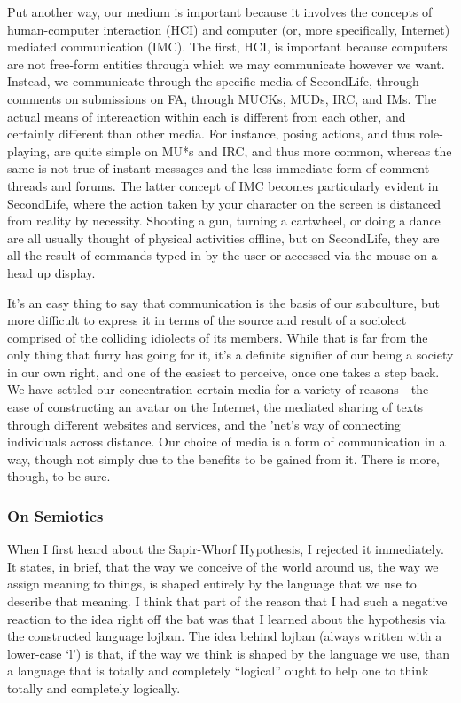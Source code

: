 Put another way, our medium is important because it involves the
concepts of human-computer interaction (HCI) and computer (or, more
specifically, Internet) mediated communication (IMC). The first, HCI, is
important because computers are not free-form entities through which we
may communicate however we want. Instead, we communicate through the
specific media of SecondLife, through comments on submissions on FA,
through MUCKs, MUDs, IRC, and IMs. The actual means of intereaction
within each is different from each other, and certainly different than
other media. For instance, posing actions, and thus role-playing, are
quite simple on MU*s and IRC, and thus more common, whereas the same is
not true of instant messages and the less-immediate form of comment
threads and forums. The latter concept of IMC becomes particularly
evident in SecondLife, where the action taken by your character on the
screen is distanced from reality by necessity. Shooting a gun, turning a
cartwheel, or doing a dance are all usually thought of physical
activities offline, but on SecondLife, they are all the result of
commands typed in by the user or accessed via the mouse on a head up
display.

It's an easy thing to say that communication is the basis of our
subculture, but more difficult to express it in terms of the source and
result of a sociolect comprised of the colliding idiolects of its
members. While that is far from the only thing that furry has going for
it, it's a definite signifier of our being a society in our own right,
and one of the easiest to perceive, once one takes a step back. We have
settled our concentration certain media for a variety of reasons - the
ease of constructing an avatar on the Internet, the mediated sharing of
texts through different websites and services, and the 'net's way of
connecting individuals across distance. Our choice of media is a form of
communication in a way, though not simply due to the benefits to be
gained from it. There is more, though, to be sure.

\subsubsection{On Semiotics}\label{on-semiotics}

When I first heard about the Sapir-Whorf Hypothesis, I rejected it
immediately. It states, in brief, that the way we conceive of the world
around us, the way we assign meaning to things, is shaped entirely by
the language that we use to describe that meaning. I think that part of
the reason that I had such a negative reaction to the idea right off the
bat was that I learned about the hypothesis via the constructed language
lojban. The idea behind lojban (always written with a lower-case `l') is
that, if the way we think is shaped by the language we use, than a
language that is totally and completely ``logical'' ought to help one to
think totally and completely logically.

